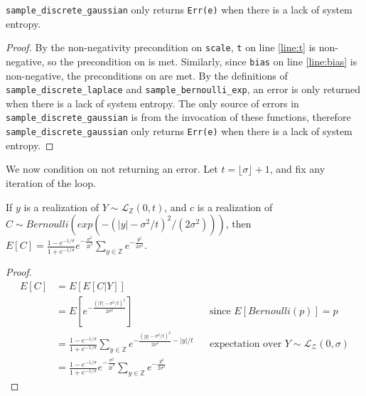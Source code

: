 \documentclass{article}
\begin{document}
\begin{lemma}
    \label{err-e}
    \texttt{sample\_discrete\_gaussian} only returns \texttt{Err(e)} when there is a lack of system entropy.
\end{lemma}

\begin{proof}
    By the non-negativity precondition on \texttt{scale}, \texttt{t} on line \ref{line:t} is non-negative,
    so the precondition on  is met.
    Similarly, since \texttt{bias} on line \ref{line:bias} is non-negative, the preconditions on  are met.
    By the definitions of \texttt{sample\_discrete\_laplace} and \texttt{sample\_bernoulli\_exp}, an error is only returned when there is a lack of system entropy.
    The only source of errors in \texttt{sample\_discrete\_gaussian} is from the invocation of these functions,
    therefore \texttt{sample\_discrete\_gaussian} only returns \texttt{Err(e)} when there is a lack of system entropy.
\end{proof}

We now condition on not returning an error.
Let $t = \lfloor \sigma \rfloor + 1$, and fix any iteration of the loop.

\begin{lemma}\cite{CKS20}
    \label{E_C}
    If $y$ is a realization of $Y \sim \mathcal{L}_\mathbb{Z}(0, t)$, and $c$ is a realization of $C \sim Bernoulli(exp(-(|y| - \sigma^2 / t)^2 / (2 \sigma^2)))$, then
    $E[C] = \frac{1 - e^{-1/\sigma}}{1 + e^{-1/\sigma}}e^{-\frac{\sigma^2}{2t^2}} \sum_{y\in \mathbb{Z}} e^{-\frac{y^2}{2\sigma^2}}$.
\end{lemma}

\begin{proof}
    \begin{align*}
        E[C] &= E[E[C|Y]] \\
        &= E[e^{-\frac{(|Y| - \sigma^2/t)^2}{2\sigma^2}}] && \text{since } E[Bernoulli(p)] = p \\
        &= \frac{1 - e^{-1/\sigma}}{1 + e^{-1/\sigma}} \sum_{y\in \mathbb{Z}} e^{-\frac{(|y| - \sigma^2/t)^2}{2\sigma^2} - |y|/t} && \text{expectation over } Y \sim \mathcal{L}_\mathcal{Z}(0, \sigma) \\
        &= \frac{1 - e^{-1/\sigma}}{1 + e^{-1/\sigma}}e^{-\frac{\sigma^2}{2t^2}} \sum_{y\in \mathbb{Z}} e^{-\frac{y^2}{2\sigma^2}}
    \end{align*}
\end{proof}
\end{document}

